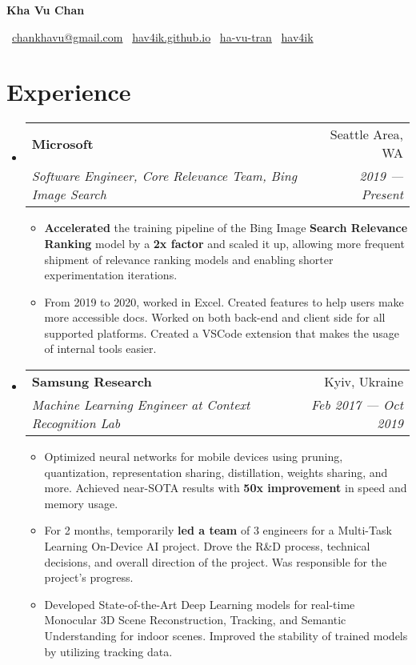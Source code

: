 \documentclass[letterpaper,11pt]{article}
\makeatletter
\newcommand{\resumeItem}[1]{
  \item[--]\small{
    {#1 \vspace{-2pt}}
  }
}
\newcommand{\resumeSubheading}[4]{
  \vspace{-1pt}\item
    \begin{tabular*}{0.97\textwidth}{l@{\extracolsep{\fill}}r}
      \textbf{#1} & #2 \\
      \textit{\small#3} & \textit{\small #4} \\
    \end{tabular*}\vspace{-5pt}
}
\newcommand{\resumeSubHeadingListStart}{\begin{itemize}[leftmargin=*]}
\newcommand{\resumeSubHeadingListEnd}{\end{itemize}}
\newcommand{\resumeItemListStart}{\begin{itemize}[leftmargin=*]}
\newcommand{\resumeItemListEnd}{\end{itemize}\vspace{-5pt}}
\makeatother
\begin{document}


\centerline{\textbf{{\LARGE Kha Vu Chan}}}\medskip
\centerline{
\faEnvelope \, \href{mailto:chankhavu@gmail.com}{chankhavu@gmail.com} \quad
\faLink \, \href{https://hav4ik.github.io/}{hav4ik.github.io} \quad
\faLinkedinSquare \, \href{https://www.linkedin.com/in/ha-vu-tran/}{ha-vu-tran} \quad
\faGithub \, \href{https://github.com/hav4ik}{hav4ik}
}


\section{Experience}
  \resumeSubHeadingListStart

    \resumeSubheading
      {Microsoft}{Seattle Area, WA}
      {Software Engineer, Core Relevance Team, Bing Image Search}{2019 --- Present}
      \resumeItemListStart
        \resumeItem{{\bf Accelerated} the training pipeline of the Bing Image {\bf Search Relevance Ranking} model by a {\bf 2x factor} and scaled it up, allowing more frequent shipment of relevance ranking models and enabling shorter experimentation iterations.}
        \resumeItem{From 2019 to 2020, worked in Excel. Created features to help users make more accessible docs. Worked on both back-end and client side for all supported platforms. Created a VSCode extension that makes the usage of internal tools easier.}
      \resumeItemListEnd

    \resumeSubheading
      {Samsung Research}{Kyiv, Ukraine}
      {Machine Learning Engineer at Context Recognition Lab}{Feb 2017 --- Oct 2019}
      \resumeItemListStart
        \resumeItem
          {Optimized neural networks for mobile devices using pruning, quantization, representation sharing, distillation, weights sharing, and more. Achieved near-SOTA results with {\bf 50x improvement} in speed and memory usage.}
        \resumeItem
          {For 2 months, temporarily {\bf led a team} of 3 engineers for a Multi-Task Learning On-Device AI project. Drove the R\&D process, technical decisions, and overall direction of the project. Was responsible for the project's progress.}
        \resumeItem
          {Developed State-of-the-Art Deep Learning models for real-time Monocular 3D Scene Reconstruction, Tracking, and Semantic Understanding for indoor scenes. Improved the stability of trained models by utilizing tracking data.}
      \resumeItemListEnd
  \resumeSubHeadingListEnd
\end{document}
